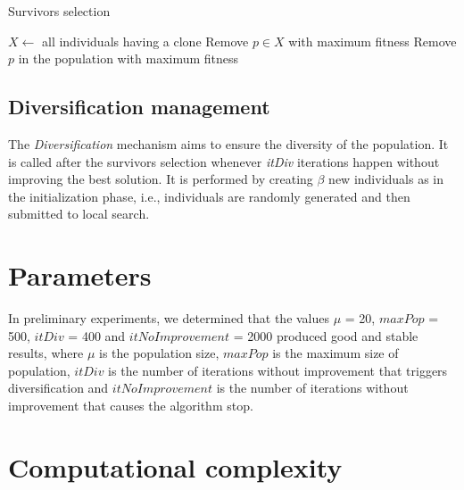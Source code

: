 \begin{algorithm}[H]
\caption{Survivors selection}
\label{survivors}
\begin{algorithmic}[1]
\STATE $X \leftarrow $ all individuals having a clone
\STATE Remove $p \in X$ with maximum fitness
\ELSE
\STATE Remove $p$ in the population with maximum fitness
\ENDIF
\ENDFOR
\end{algorithmic}
\end{algorithm}

\subsection{Diversification management}
The \textit{Diversification} mechanism aims to ensure the diversity of the population. It is called after the survivors selection whenever \textit{itDiv} iterations happen without improving the best solution. It is performed by creating $\beta$ new individuals as in the initialization phase, i.e., individuals are randomly generated and then submitted to local search.

\section{Parameters}
In preliminary experiments, we determined that the values $\mu$ = 20, $maxPop$ = 500, $itDiv$ = 400 and $itNoImprovement$ = 2000 produced good and stable results, where $\mu$ is the population size, $maxPop$ is the maximum size of population, $itDiv$ is the number of iterations without improvement that triggers diversification and $itNoImprovement$ is the number of iterations without improvement that causes the algorithm stop.

\section{Computational complexity}